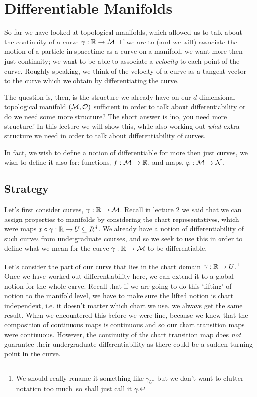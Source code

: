 \chapter{Differentiable Manifolds}

So far we have looked at topological manifolds, which allowed us to talk about the continuity of a curve $\gamma:\mathbb{R}\to\mathcal{M}$. If we are to (and we will) associate the motion of a particle in spacetime as a curve on a manifold, we want more then just continuity; we want to be able to associate a \textit{velocity} to each point of the curve. Roughly speaking, we think of the velocity of a curve as a tangent vector to the curve which we obtain by differentiating the curve. 

The question is, then, is the structure we already have on our $d$-dimensional topological manifold $(\mathcal{M},\mathcal{O})$ sufficient in order to talk about differentiability  or do we need some more structure? The short answer is `no, you need more structure.' In this lecture we will show this, while also working out \textit{what} extra structure we need in order to talk about differentiability of curves.

In fact, we wish to define a notion of differentiable for more then just curves, we wish to define it also for: functions, $f:\mathcal{M}\to\mathbb{R}$, and maps, $\varphi:\mathcal{M}\to\mathcal{N}$.

\section{Strategy}

Let's first consider curves, $\gamma:\mathbb{R}\to\mathcal{M}$. Recall in lecture 2 we said that we can assign properties to manifolds by considering the chart representatives, which were maps $x\circ\gamma: \mathbb{R}\to U\subseteq R^d$. We already have a notion of differentiability of such curves from undergraduate courses, and so we seek to use this in order to define what we mean for the curve $\gamma:\mathbb{R}\to\mathcal{M}$ to be differentiable. 

Let's consider the part of our curve that lies in the chart domain $\gamma: \mathbb{R} \to U$.\footnote{We should really rename it something like $\gamma_U$, but we don't want to clutter notation too much, so shall just call it $\gamma$.} Once we have worked out differentiability here, we can extend it to a global notion for the whole curve. Recall that if we are going to do this `lifting' of notion to the manifold level, we have to make sure the lifted notion is chart independent, i.e. it doesn't matter which chart we use, we always get the same result. When we encountered this before we were fine, because we knew that the composition of continuous maps is continuous and so our chart transition maps were continuous. However, the continuity of the chart transition map does \textit{not} guarantee their undergraduate differentiability as there could be a sudden turning point in the curve. 

